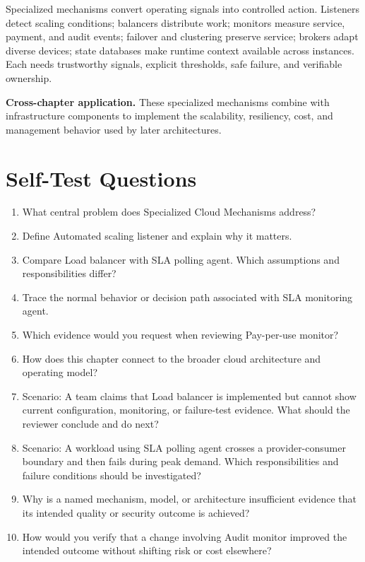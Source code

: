 \documentclass[11pt]{article}
\begin{document}
\begin{synthesisbox}
Specialized mechanisms convert operating signals into controlled action. Listeners detect scaling conditions; balancers distribute work; monitors measure service, payment, and audit events; failover and clustering preserve service; brokers adapt diverse devices; state databases make runtime context available across instances. Each needs trustworthy signals, explicit thresholds, safe failure, and verifiable ownership.
\par\smallskip
\textbf{Cross-chapter application.} These specialized mechanisms combine with infrastructure components to implement the scalability, resiliency, cost, and management behavior used by later architectures.
\end{synthesisbox}
\section{Self-Test Questions}
\begin{enumerate}
\item What central problem does Specialized Cloud Mechanisms address?
\item Define Automated scaling listener and explain why it matters.
\item Compare Load balancer with SLA polling agent. Which assumptions and responsibilities differ?
\item Trace the normal behavior or decision path associated with SLA monitoring agent.
\item Which evidence would you request when reviewing Pay-per-use monitor?
\item How does this chapter connect to the broader cloud architecture and operating model?
\item Scenario: A team claims that Load balancer is implemented but cannot show current configuration, monitoring, or failure-test evidence. What should the reviewer conclude and do next?
\item Scenario: A workload using SLA polling agent crosses a provider-consumer boundary and then fails during peak demand. Which responsibilities and failure conditions should be investigated?
\item Why is a named mechanism, model, or architecture insufficient evidence that its intended quality or security outcome is achieved?
\item How would you verify that a change involving Audit monitor improved the intended outcome without shifting risk or cost elsewhere?
\end{enumerate}
\clearpage
\end{document}
